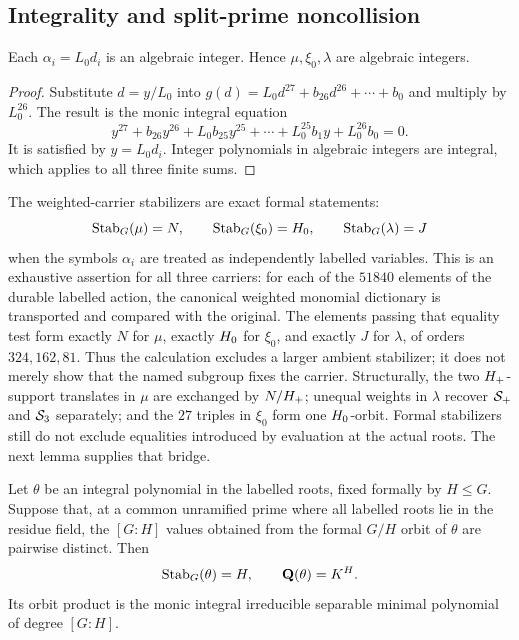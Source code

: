 \subsection{Integrality and split-prime noncollision}

\begin{lemma}
\label{lem:integral-scaling}
Each $\alpha_i=L_0d_i$ is an algebraic integer.  Hence
$\mu,\xi_0,\lambda$ are algebraic integers.
\end{lemma}

\begin{proof}
Substitute $d=y/L_0$ into
$g(d)=L_0d^{27}+b_{26}d^{26}+\cdots+b_0$ and multiply by $L_0^{26}$.  The
result is the monic integral equation
\[
 y^{27}+b_{26}y^{26}+L_0b_{25}y^{25}+\cdots
   +L_0^{25}b_1y+L_0^{26}b_0=0.
\]
It is satisfied by $y=L_0d_i$.  Integer polynomials in algebraic integers
are integral, which applies to all three finite sums.
\end{proof}

The weighted-carrier stabilizers are exact formal statements:
\begin{equation}
 \operatorname{Stab}_G(\mu)=N,\qquad \operatorname{Stab}_G(\xi_0)=H_{0},\qquad
 \operatorname{Stab}_G(\lambda)=J
 \label{eq:formal-stabilizers}
\end{equation}
when the symbols $\alpha_i$ are treated as independently labelled variables.
This is an exhaustive assertion for all three carriers: for each of the
$51840$ elements of the durable labelled action, the canonical weighted
monomial dictionary is transported and compared with the original.  The
elements passing that equality test form exactly $N$ for $\mu$, exactly
$H_{0}$ for $\xi_0$, and exactly $J$ for $\lambda$, of orders
$324,162,81$.  Thus the calculation excludes a larger ambient stabilizer; it
does not merely show that the named subgroup fixes the carrier.  Structurally,
the two $H_{+}$-support translates in $\mu$ are exchanged by
$N/H_{+}$; unequal weights in $\lambda$ recover $\mathcal{S}_+$ and $\mathcal{S}_3$
separately; and the $27$ triples in $\xi_0$ form one $H_{0}$-orbit.  Formal
stabilizers still do not exclude equalities introduced by evaluation at the
actual roots.  The next lemma supplies that bridge.

\begin{lemma}
\label{lem:split-noncollision}
Let $\theta$ be an integral polynomial in the labelled roots, fixed formally
by $H\le G$.  Suppose that, at a common unramified prime where all labelled
roots lie in the residue field, the $[G:H]$ values obtained from the formal
$G/H$ orbit of $\theta$ are pairwise distinct.  Then
\[
 \operatorname{Stab}_G(\theta)=H,\qquad \mathbf{Q}(\theta)=K^H.
\]
Its orbit product is the monic integral irreducible separable minimal
polynomial of degree $[G:H]$.
\end{lemma}

